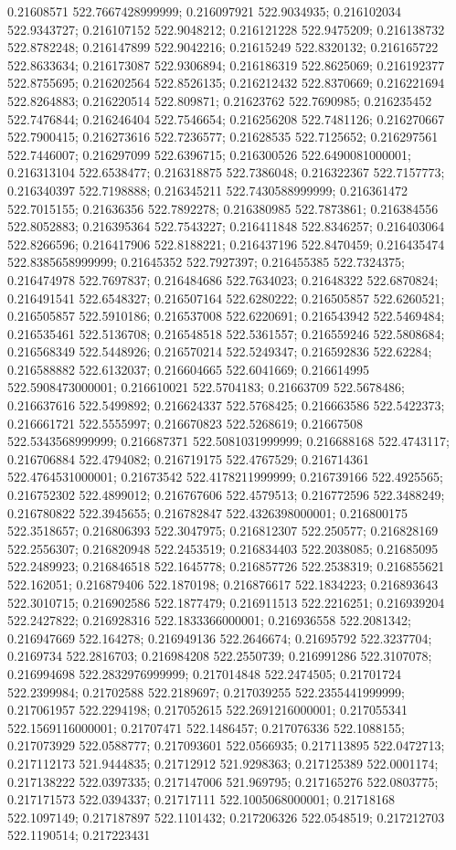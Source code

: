 0.21608571 522.7667428999999; 0.216097921 522.9034935; 0.216102034 522.9343727; 0.216107152 522.9048212; 0.216121228 522.9475209; 0.216138732 522.8782248; 0.216147899 522.9042216; 0.21615249 522.8320132; 0.216165722 522.8633634; 0.216173087 522.9306894; 0.216186319 522.8625069; 0.216192377 522.8755695; 0.216202564 522.8526135; 0.216212432 522.8370669; 0.216221694 522.8264883; 0.216220514 522.809871; 0.21623762 522.7690985; 0.216235452 522.7476844; 0.216246404 522.7546654; 0.216256208 522.7481126; 0.216270667 522.7900415; 0.216273616 522.7236577; 0.21628535 522.7125652; 0.216297561 522.7446007; 0.216297099 522.6396715; 0.216300526 522.6490081000001; 0.216313104 522.6538477; 0.216318875 522.7386048; 0.216322367 522.7157773; 0.216340397 522.7198888; 0.216345211 522.7430588999999; 0.216361472 522.7015155; 0.21636356 522.7892278; 0.216380985 522.7873861; 0.216384556 522.8052883; 0.216395364 522.7543227; 0.216411848 522.8346257; 0.216403064 522.8266596; 0.216417906 522.8188221; 0.216437196 522.8470459; 0.216435474 522.8385658999999; 0.21645352 522.7927397; 0.216455385 522.7324375; 0.216474978 522.7697837; 0.216484686 522.7634023; 0.21648322 522.6870824; 0.216491541 522.6548327; 0.216507164 522.6280222; 0.216505857 522.6260521; 0.216505857 522.5910186; 0.216537008 522.6220691; 0.216543942 522.5469484; 0.216535461 522.5136708; 0.216548518 522.5361557; 0.216559246 522.5808684; 0.216568349 522.5448926; 0.216570214 522.5249347; 0.216592836 522.62284; 0.216588882 522.6132037; 0.216604665 522.6041669; 0.216614995 522.5908473000001; 0.216610021 522.5704183; 0.21663709 522.5678486; 0.216637616 522.5499892; 0.216624337 522.5768425; 0.216663586 522.5422373; 0.216661721 522.5555997; 0.216670823 522.5268619; 0.21667508 522.5343568999999; 0.216687371 522.5081031999999; 0.216688168 522.4743117; 0.216706884 522.4794082; 0.216719175 522.4767529; 0.216714361 522.4764531000001; 0.21673542 522.4178211999999; 0.216739166 522.4925565; 0.216752302 522.4899012; 0.216767606 522.4579513; 0.216772596 522.3488249; 0.216780822 522.3945655; 0.216782847 522.4326398000001; 0.216800175 522.3518657; 0.216806393 522.3047975; 0.216812307 522.250577; 0.216828169 522.2556307; 0.216820948 522.2453519; 0.216834403 522.2038085; 0.21685095 522.2489923; 0.216846518 522.1645778; 0.216857726 522.2538319; 0.216855621 522.162051; 0.216879406 522.1870198; 0.216876617 522.1834223; 0.216893643 522.3010715; 0.216902586 522.1877479; 0.216911513 522.2216251; 0.216939204 522.2427822; 0.216928316 522.1833366000001; 0.216936558 522.2081342; 0.216947669 522.164278; 0.216949136 522.2646674; 0.21695792 522.3237704; 0.2169734 522.2816703; 0.216984208 522.2550739; 0.216991286 522.3107078; 0.216994698 522.2832976999999; 0.217014848 522.2474505; 0.21701724 522.2399984; 0.21702588 522.2189697; 0.217039255 522.2355441999999; 0.217061957 522.2294198; 0.217052615 522.2691216000001; 0.217055341 522.1569116000001; 0.21707471 522.1486457; 0.217076336 522.1088155; 0.217073929 522.0588777; 0.217093601 522.0566935; 0.217113895 522.0472713; 0.217112173 521.9444835; 0.21712912 521.9298363; 0.217125389 522.0001174; 0.217138222 522.0397335; 0.217147006 521.969795; 0.217165276 522.0803775; 0.217171573 522.0394337; 0.21717111 522.1005068000001; 0.21718168 522.1097149; 0.217187897 522.1101432; 0.217206326 522.0548519; 0.217212703 522.1190514; 0.217223431 